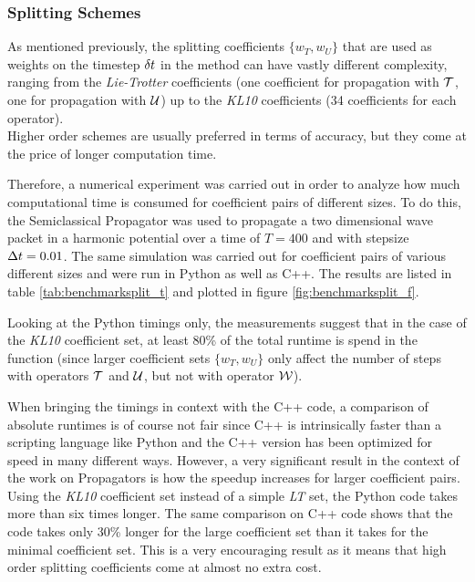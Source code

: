 \subsubsection{Splitting Schemes}
%
As mentioned previously, the splitting coefficients $\{ w_T, w_U \}$ that are used as weights on the timestep $\delta t$ in the  method can have vastly different complexity, ranging from the \emph{Lie-Trotter} coefficients (one coefficient for propagation with $\mathcal{T}$, one for propagation with $\mathcal{U}$) up to the \emph{KL10} coefficients (34 coefficients for each operator). \\
Higher order schemes are usually preferred in terms of accuracy, but they come at the price of longer computation time.
\par\medskip
%
Therefore, a numerical experiment was carried out in order to analyze how much computational time is consumed for coefficient pairs of different sizes.
To do this, the Semiclassical Propagator was used to propagate a two dimensional wave packet in a harmonic potential over a time of $T = 400$ and with stepsize $\Delta t = 0.01$.
The same simulation was carried out for coefficient pairs of various different sizes and were run in Python as well as C++.
The results are listed in table \ref{tab:benchmarksplit_t} and plotted in figure \ref{fig:benchmarksplit_f}.
\par\medskip
%
Looking at the Python timings only, the measurements suggest that in the case of the \emph{KL10} coefficient set, at least 80\% of the total runtime is spend in the  function (since larger coefficient sets $\{ w_T, w_U \}$ only affect the number of steps with operators $\mathcal{T}$ and $\mathcal{U}$, but not with operator $\mathcal{W}$).
\par\medskip
%
When bringing the timings in context with the C++ code, a comparison of absolute runtimes is of course not fair since C++ is intrinsically faster than a scripting language like Python and the C++ version has been optimized for speed in many different ways.
However, a very significant result in the context of the work on Propagators is how the speedup increases for larger coefficient pairs.
Using the \emph{KL10} coefficient set instead of a simple \emph{LT} set, the Python code takes more than six times longer.
The same comparison on C++ code shows that the code takes only 30\% longer for the large coefficient set than it takes for the minimal coefficient set.
This is a very encouraging result as it means that high order splitting coefficients come at almost no extra cost.
\par\medskip
